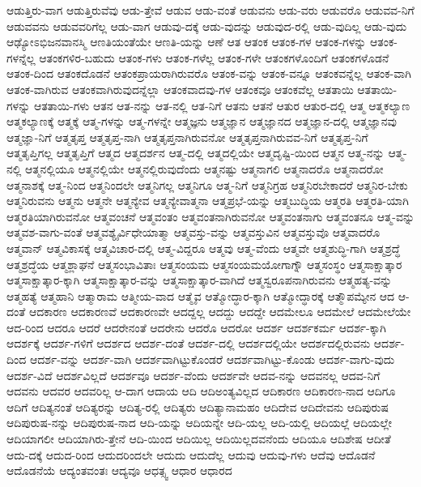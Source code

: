 {ಆಡುತ್ತಿರು-ವಾಗ
ಆಡುತ್ತಿರುವೆವು
ಆಡು-ತ್ತೇವೆ
ಆಡುವ
ಆಡು-ವಂತೆ
ಆಡುವನು
ಆಡು-ವರು
ಆಡುವರೊ
ಆಡುವವ-ನಿಗೆ
ಆಡುವವನು
ಆಡುವವರಿಗೆಲ್ಲ
ಆಡು-ವಾಗ
ಆಡುವು-ದಕ್ಕೆ
ಆಡು-ವುದನ್ನು
ಆಡುವುದ-ರಲ್ಲಿ
ಆಡು-ವುದಿಲ್ಲ
ಆಡು-ವುದು
ಆಢ್ಯೋಽಭಿಜನವಾನಸ್ಮಿ
ಆಣತಿಯಂತೆಯೇ
ಆಣತಿ-ಯನ್ನು
ಆಣೆ
ಆತ
ಆತಂಕ
ಆತಂಕ-ಗಳ
ಆತಂಕ-ಗಳನ್ನು
ಆತಂಕ-ಗಳನ್ನೆಲ್ಲ
ಆತಂಕಗಳಿರ-ಬಹುದು
ಆತಂಕ-ಗಳು
ಆತಂಕ-ಗಳೆಲ್ಲ
ಆತಂಕ-ಗಳೇ
ಆತಂಕಗಳೊಂದಿಗೆ
ಆತಂಕಗಳೊಡನೆ
ಆತಂಕ-ದಿಂದ
ಆತಂಕದೊಡನೆ
ಆತಂಕಪ್ರಾಯರಾಗಿರುವರೊ
ಆತಂಕ-ವನ್ನು
ಆತಂಕ-ವನ್ನೂ
ಆತಂಕವನ್ನೆಲ್ಲ
ಆತಂಕ-ವಾಗಿ
ಆತಂಕ-ವಾಗಿರುವ
ಆತಂಕವಾಗಿರುವುದನ್ನೆಲ್ಲಾ
ಆತಂಕವಾದವು-ಗಳ
ಆತಂಕವೂ
ಆತಂಕವೆಲ್ಲ
ಆತತಾಯಿ
ಆತತಾಯಿ-ಗಳನ್ನು
ಆತತಾಯಿ-ಗಳು
ಆತನ
ಆತ-ನನ್ನು
ಆತ-ನಲ್ಲಿ
ಆತ-ನಿಗೆ
ಆತನು
ಆತನೆ
ಆತುರ
ಆತುರ-ದಲ್ಲಿ
ಆತ್ಮ
ಆತ್ಮಕಲ್ಯಾಣ
ಆತ್ಮಕಲ್ಯಾಣಕ್ಕೆ
ಆತ್ಮಕ್ಕೆ
ಆತ್ಮ-ಗಳನ್ನು
ಆತ್ಮ-ಗಳನ್ನೇ
ಆತ್ಮಜ್ಞನು
ಆತ್ಮಜ್ಞಾನ
ಆತ್ಮಜ್ಞಾನದ
ಆತ್ಮಜ್ಞಾನ-ದಲ್ಲಿ
ಆತ್ಮಜ್ಞಾನವು
ಆತ್ಮಜ್ಞಾ-ನಿಗೆ
ಆತ್ಮತೃಪ್ತ
ಆತ್ಮತೃಪ್ತ-ನಾಗಿ
ಆತ್ಮತೃಪ್ತನಾಗಿರುವನೋ
ಆತ್ಮತೃಪ್ತನಾಗಿರುವವ-ನಿಗೆ
ಆತ್ಮತೃಪ್ತ-ನಿಗೆ
ಆತ್ಮತೃಪ್ತಿಗಲ್ಲ
ಆತ್ಮತೃಪ್ತಿಗೆ
ಆತ್ಮದ
ಆತ್ಮದರ್ಶನ
ಆತ್ಮ-ದಲ್ಲಿ
ಆತ್ಮದಲ್ಲಿಯೇ
ಆತ್ಮದೃಷ್ಟಿ-ಯಿಂದ
ಆತ್ಮನ
ಆತ್ಮ-ನನ್ನು
ಆತ್ಮ-ನಲ್ಲಿ
ಆತ್ಮನಲ್ಲಿಯೂ
ಆತ್ಮನಲ್ಲಿಯೇ
ಆತ್ಮನಲ್ಲಿರುವುದೆಂದು
ಆತ್ಮನಷ್ಟು
ಆತ್ಮನಾಗಲಿ
ಆತ್ಮನಾದರೊ
ಆತ್ಮನಾದರೋ
ಆತ್ಮನಾಶಕ್ಕೆ
ಆತ್ಮ-ನಿಂದ
ಆತ್ಮನಿಂದಲೇ
ಆತ್ಮನಿಗಲ್ಲ
ಆತ್ಮನಿಗೂ
ಆತ್ಮ-ನಿಗೆ
ಆತ್ಮನಿಗ್ರಹ
ಆತ್ಮನಿರಬೇಕಾದರೆ
ಆತ್ಮನಿರ-ಬೇಕು
ಆತ್ಮನಿರುವನು
ಆತ್ಮನು
ಆತ್ಮನೇ
ಆತ್ಮನ್ಯೇವ
ಆತ್ಮನ್ಯೇವಾತ್ಮನಾ
ಆತ್ಮಪ್ರಭೆ-ಯನ್ನು
ಆತ್ಮಬುದ್ಧಿಯ
ಆತ್ಮರತಿ
ಆತ್ಮರತಿ-ಯಾಗಿ
ಆತ್ಮರತಿಯಾಗಿರುವನೋ
ಆತ್ಮವಂಚನೆ
ಆತ್ಮವಂತಂ
ಆತ್ಮವಂತನಾಗಿರುವನೋ
ಆತ್ಮವಂತನಾಗು
ಆತ್ಮವಂತನೂ
ಆತ್ಮ-ವನ್ನು
ಆತ್ಮವಶ-ವಾಗು-ವಂತೆ
ಆತ್ಮವಶ್ಯೈರ್ವಿಧೇಯಾತ್ಮಾ
ಆತ್ಮವಸ್ತು-ವನ್ನು
ಆತ್ಮವಸ್ತುವಿನ
ಆತ್ಮವಸ್ತುವೊ
ಆತ್ಮವಾದರೊ
ಆತ್ಮವಾನ್
ಆತ್ಮವಿಕಾಸಕ್ಕೆ
ಆತ್ಮವಿಚಾರ-ದಲ್ಲಿ
ಆತ್ಮ-ವಿದ್ದರೂ
ಆತ್ಮವು
ಆತ್ಮ-ವೆಂದು
ಆತ್ಮವೇ
ಆತ್ಮಶುದ್ಧಿ-ಗಾಗಿ
ಆತ್ಮಶ್ರದ್ಧೆ
ಆತ್ಮಶ್ರದ್ಧೆಯ
ಆತ್ಮಶ್ಲಾಘನೆ
ಆತ್ಮಸಂಭಾವಿತಾಃ
ಆತ್ಮಸಂಯಮ
ಆತ್ಮಸಂಯಮಯೋಗಾಗ್ನೌ
ಆತ್ಮಸಂಸ್ಥಂ
ಆತ್ಮಸಾಕ್ಷಾತ್ಕಾರ
ಆತ್ಮಸಾಕ್ಷಾತ್ಕಾರ-ಕ್ಕಾಗಿ
ಆತ್ಮಸಾಕ್ಷಾತ್ಕಾರ-ವನ್ನು
ಆತ್ಮಸಾಕ್ಷಾತ್ಕಾರ-ವಾಗಿದೆ
ಆತ್ಮಸ್ವರೂಪನಾಗಿರುವನು
ಆತ್ಮಹತ್ಯ-ವನ್ನು
ಆತ್ಮಹತ್ಯೆ
ಆತ್ಮಹಾನಿ
ಆತ್ಮಾರಾಮ
ಆತ್ಮೀಯ-ವಾದ
ಆತ್ಮೈವ
ಆತ್ಮೋದ್ಧಾರ-ಕ್ಕಾಗಿ
ಆತ್ಮೋದ್ಧಾರಕ್ಕೆ
ಆತ್ಮೌಪಮ್ಯೇನ
ಆದ
ಆ-ದಂತೆ
ಆದಕಾರಣ
ಆದಕಾರಣವೆ
ಆದಕಾರಣವೇ
ಆದದ್ದಲ್ಲ
ಆದದ್ದು
ಆದದ್ದೇ
ಆದಮೇಲೂ
ಆದಮೇಲೆ
ಆದಮೇಲೆಯೇ
ಆದ-ರಿಂದ
ಆದರೂ
ಆದರೆ
ಆದರೇನಂತೆ
ಆದರೇನು
ಆದರೊ
ಆದರೋ
ಆದರ್ಶ
ಆದರ್ಶಕರ್ಮ
ಆದರ್ಶ-ಕ್ಕಾಗಿ
ಆದರ್ಶಕ್ಕೆ
ಆದರ್ಶ-ಗಳಿಗೆ
ಆದರ್ಶದ
ಆದರ್ಶ-ದಂತೆ
ಆದರ್ಶ-ದಲ್ಲಿ
ಆದರ್ಶದಲ್ಲಿಯೇ
ಆದರ್ಶದಲ್ಲಿರುವನು
ಆದರ್ಶ-ದಿಂದ
ಆದರ್ಶ-ವನ್ನು
ಆದರ್ಶ-ವಾಗಿ
ಆದರ್ಶವಾಗಿಟ್ಟುಕೊಂಡರೆ
ಆದರ್ಶವಾಗಿಟ್ಟು-ಕೊಂಡು
ಆದರ್ಶ-ವಾಗು-ವುದು
ಆದರ್ಶ-ವಿದೆ
ಆದರ್ಶವಿಲ್ಲದೆ
ಆದರ್ಶವೂ
ಆದರ್ಶ-ವೆಂದು
ಆದರ್ಶವೇ
ಆದವ-ನನ್ನು
ಆದವನಲ್ಲ
ಆದವ-ನಿಗೆ
ಆದವನು
ಆದವರ
ಆದವರಿಲ್ಲ
ಆ-ದಾಗ
ಆದಾಯ
ಆದಿ
ಆದಿಅಂತ್ಯವಿಲ್ಲದ
ಆದಿಕಾರಣ
ಆದಿಕಾರಣ-ನಾದ
ಆದಿಗೂ
ಆದಿಗೆ
ಆದಿತ್ಯನಂತೆ
ಆದಿತ್ಯರನ್ನು
ಆದಿತ್ಯ-ರಲ್ಲಿ
ಆದಿತ್ಯರು
ಆದಿತ್ಯಾನಾಮಹಂ
ಆದಿದೇವ
ಆದಿದೇವನು
ಆದಿಪುರುಷ
ಆದಿಪುರುಷ-ನನ್ನು
ಆದಿಪುರುಷ-ನಾದ
ಆದಿ-ಯನ್ನು
ಆದಿಯನ್ನೇ
ಆದಿ-ಯಲ್ಲ
ಆದಿ-ಯಲ್ಲಿ
ಆದಿಯಲ್ಲೆ
ಆದಿಯಲ್ಲೇ
ಆದಿಯಾಗಲೀ
ಆದಿಯಾಗಿರು-ತ್ತೇನೆ
ಆದಿ-ಯಿಂದ
ಆದಿಯಿಲ್ಲ
ಆದಿಯಿಲ್ಲದವನೆಂದು
ಆದಿಯೂ
ಆದಿಶೇಷ
ಆದೀತೆ
ಆದು-ದಕ್ಕೆ
ಆದುದ-ರಿಂದ
ಆದುದರಿಂದಲೇ
ಆದುದು
ಆದುದೆಲ್ಲ
ಆದುವು
ಆದುವು-ಗಳು
ಆದೆವು
ಆದೊಡನೆ
ಆದೊಡನೆಯೆ
ಆದ್ಯಂತವಂತಃ
ಆದ್ಯವೂ
ಆಧತ್ಸ್ವ
ಆಧಾರ
ಆಧಾರದ
}
